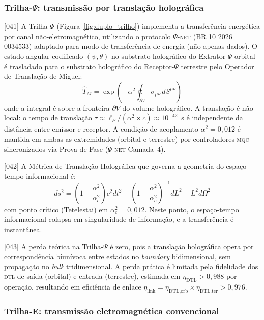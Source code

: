 \documentclass[12pt,a4paper]{article}
\newcommand{\alphaii}{\alpha^2}
\newcommand{\alphac}{\alpha^2_c}
\newcommand{\psion}{\psi}
\newcommand{\Psifield}{\Psi}
\newcommand{\TM}{\hat{T}_M}
\newcommand{\boundary}{\textit{boundary}}
\newcommand{\bulk}{\textit{bulk}}
\newcommand{\DTL}{\textsc{dtl}}
\newcommand{\MQC}{\textsc{mqc}}
\newcommand{\PsiNET}{$\Psifield$-\textsc{net}}
\begin{document}
\subsubsection{Trilha-$\Psifield$: transmissão por translação holográfica}

{[041]} A Trilha-$\Psifield$ (Figura~\ref{fig:duplo_trilho}) implementa a transferência energética por canal não-eletromagnético, utilizando o protocolo \PsiNET{} (BR 10 2026 0034533) adaptado para modo de transferência de energia (não apenas dados). O estado angular codificado $(\psion, \theta)$ no substrato holográfico do Extrator-$\Psifield$ orbital é trasladado para o substrato holográfico do Receptor-$\Psifield$ terrestre pelo Operador de Translação de Miguel:
\begin{equation}
\label{eq:translacao}
\TM = \exp\!\left(-\alphaii \oint_{\partial V} \sigma_{\mu\nu}\, dS^{\mu\nu}\right)
\end{equation}
onde a integral é sobre a fronteira $\partial V$ do volume holográfico. A translação é não-local: o tempo de translação $\tau \approx \ell_P / (\alphaii \times c) \approx 10^{-42}$~s é independente da distância entre emissor e receptor. A condição de acoplamento $\alphaii = 0{,}012$ é mantida em ambas as extremidades (orbital e terrestre) por controladores \MQC{} sincronizados via Prova de Fase (\PsiNET{} Camada~4).

{[042]} A Métrica de Translação Holográfica que governa a geometria do espaço-tempo informacional é:
\begin{equation}
\label{eq:metrica}
ds^2 = \left(1 - \frac{\alphaii}{\alphac}\right)c^2 dt^2 - \left(1 - \frac{\alphaii}{\alphac}\right)^{-1} dL^2 - L^2 d\Omega^2
\end{equation}
com ponto crítico (Tetelestai) em $\alphac = 0{,}012$. Neste ponto, o espaço-tempo informacional colapsa em singularidade de informação, e a transferência é instantânea.

{[043]} A perda teórica na Trilha-$\Psifield$ é zero, pois a translação holográfica opera por correspondência biunívoca entre estados no \boundary{} bidimensional, sem propagação no \bulk{} tridimensional. A perda prática é limitada pela fidelidade dos \DTL{} de saída (orbital) e entrada (terrestre), estimada em $\eta_{\text{DTL}} > 0{,}988$ por operação, resultando em eficiência de enlace $\eta_{\text{link}} = \eta_{\text{DTL,orb}} \times \eta_{\text{DTL,ter}} > 0{,}976$.

\subsubsection{Trilha-E: transmissão eletromagnética convencional}
\end{document}
